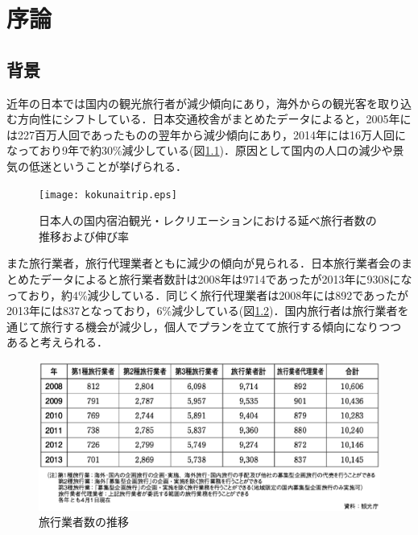 \documentclass{funthesis}
\begin{document}
\chapter{序論} %



\section{背景}
近年の日本では国内の観光旅行者が減少傾向にあり，海外からの観光客を取り込む方向性にシフトしている．日本交通校舎がまとめたデータ\cite{kokunaitrip}によると，2005年には227百万人回であったものの翌年から減少傾向にあり，2014年には16万人回になっており9年で約30\%減少している(図\ref{kokunai})．原因として国内の人口の減少や景気の低迷ということが挙げられる．

\begin{figure}[htpb]
\begin{center}
\texttt{[image: kokunaitrip.eps]}
\end{center}
\caption{日本人の国内宿泊観光・レクリエーションにおける延べ旅行者数の推移および伸び率}
\label{kokunai}
\end{figure}

また旅行業者，旅行代理業者ともに減少の傾向が見られる．日本旅行業者会のまとめたデータ\cite{ryokougyokai}によると旅行業者数計は2008年は9714であったが2013年に9308になっており，約4\%減少している．同じく旅行代理業者は2008年には892であったが2013年には837となっており，6\%減少している(図\ref{gyosya})．国内旅行者は旅行業者を通じて旅行する機会が減少し，個人でプランを立てて旅行する傾向になりつつあると考えられる．

\begin{figure}[htpb]
\begin{center}
\includegraphics[scale=0.68]{tripgyosya.eps}
\end{center}
\caption{旅行業者数の推移}
\label{gyosya}
\end{figure}
\end{document}
